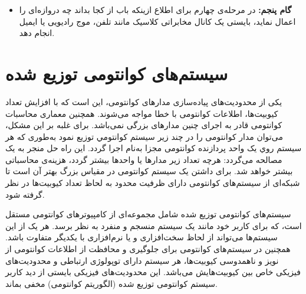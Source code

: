 \begin{itemize}
در نهایت چنانچه آلیس حالت $\ket{11}$  را اندازه بگیرد، باب حالت$\alpha\ket{1}-\beta\ket{0}$ را داراست. و این بار باب باید دو دروازه و  را پشت سرهم اعمال نماید تا حالت$\ket{\psi}$  بدست بیاد.

\item
\textbf{گام پنجم:}
در مرحله‌ی چهارم برای اطلاع ازینکه باب از کجا بداند چه دروازه‌ای را اعمال نماید، بایستی یک کانال مخابراتی کلاسیک مانند تلفن، موج رادیویی یا ایمیل انجام دهد.

\end{itemize}

\section{سیستم‌های کوانتومی توزیع شده}
 یکی از محدودیت‌های پیاده‌سازی مدارهای کوانتومی، این است که با افزایش تعداد کیوبیت‌ها، اطلاعات کوانتومی با خطا مواجه می‌شوند.  همچنین معماری محاسبات کوانتومی قادر به اجرای چنین مدارهای بزرگی نمی‌باشد\cite{Pablo}. برای غلبه بر این مشکل، می‌توان مدار کوانتومی را در چند زير سيستم كوانتومي توزيع نمود به‌طوری که هر سيستم روي یک واحد پردازنده کوانتومی مجزا به‌نام  اجرا گردد. این راه حل منجر به یک مصالحه می‌گردد: هرچه تعداد زیر مدارها یا واحدها بیشتر گردد، هزینه‌ی محاسباتی بیشتر خواهد شد. برای داشتن یک سیستم کوانتومی در مقیاس بزرگ بهتر آن است تا شبکه‌ای از سیستم‌های کوانتومی دارای ظرفیت محدود به لحاظ تعداد کیوبیت‌ها در نظر گرفته شود.
 
 سیستم‌های کوانتومی توزیع شده شامل مجموعه‌ای از کامپیوترهای کوانتومی مستقل  است، که برای کاربر خود مانند یک سیستم منسجم و منفرد به نظر برسد. هر یک از این سیستم‌ها می‌تواند از لحاظ سخت‌افزاری و یا نرم‌افزاری با یکدیگر متفاوت باشد. همچنین در سیستم‌های کوانتومی برای جلوگیری و محافظت از اطلاعات کوانتومی از نویز و ناهمدوسی کیوبیت‌ها، هر سیستم دارای توپولوژی ارتباطی و محدودیت‌های فیزیکی خاص بین کیوبیت‌هایش می‌باشد. این محدودیت‌های فیزیکی بایستی از دید کاربر سیستم‌ کوانتومی توزیع شده (الگوریتم کوانتومی) مخفی بماند.
